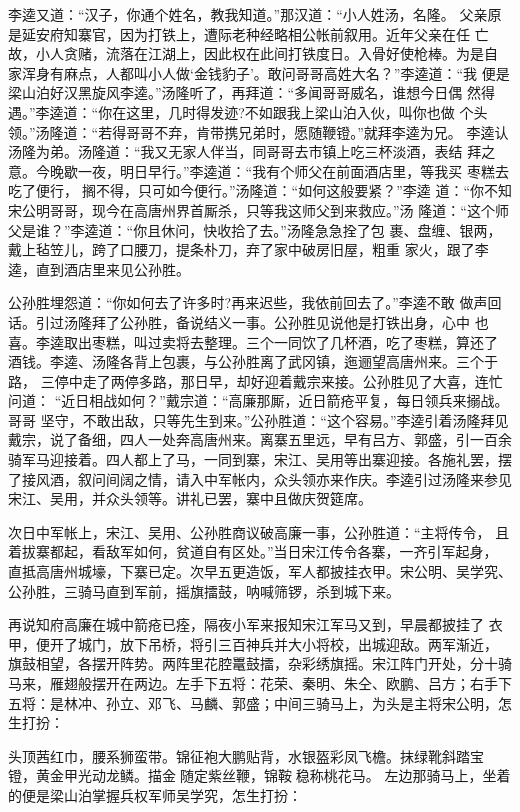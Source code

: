 李逵又道：“汉子，你通个姓名，教我知道。”那汉道：“小人姓汤，名隆。
父亲原是延安府知寨官，因为打铁上，遭际老种经略相公帐前叙用。近年父亲在任
亡故，小人贪赌，流落在江湖上，因此权在此间打铁度日。入骨好使枪棒。为是自
家浑身有麻点，人都叫小人做‘金钱豹子’。敢问哥哥高姓大名？”李逵道：“我
便是梁山泊好汉黑旋风李逵。”汤隆听了，再拜道：“多闻哥哥威名，谁想今日偶
然得遇。”李逵道：“你在这里，几时得发迹?不如跟我上梁山泊入伙，叫你也做
个头领。”汤隆道：“若得哥哥不弃，肯带携兄弟时，愿随鞭镫。”就拜李逵为兄。
李逵认汤隆为弟。汤隆道：“我又无家人伴当，同哥哥去市镇上吃三杯淡酒，表结
拜之意。今晚歇一夜，明日早行。”李逵道：“我有个师父在前面酒店里，等我买
枣糕去吃了便行，搁不得，只可如今便行。”汤隆道：“如何这般要紧？”李逵
道：“你不知宋公明哥哥，现今在高唐州界首厮杀，只等我这师父到来救应。”汤
隆道：“这个师父是谁？”李逵道：“你且休问，快收拾了去。”汤隆急急拴了包
裹、盘缠、银两，戴上毡笠儿，跨了口腰刀，提条朴刀，弃了家中破房旧屋，粗重
家火，跟了李逵，直到酒店里来见公孙胜。

公孙胜埋怨道：“你如何去了许多时?再来迟些，我依前回去了。”李逵不敢
做声回话。引过汤隆拜了公孙胜，备说结义一事。公孙胜见说他是打铁出身，心中
也喜。李逵取出枣糕，叫过卖将去整理。三个一同饮了几杯酒，吃了枣糕，算还了
酒钱。李逵、汤隆各背上包裹，与公孙胜离了武冈镇，迤逦望高唐州来。三个于路，
三停中走了两停多路，那日早，却好迎着戴宗来接。公孙胜见了大喜，连忙问道：
“近日相战如何？”戴宗道：“高廉那厮，近日箭疮平复，每日领兵来搦战。哥哥
坚守，不敢出敌，只等先生到来。”公孙胜道：“这个容易。”李逵引着汤隆拜见
戴宗，说了备细，四人一处奔高唐州来。离寨五里远，早有吕方、郭盛，引一百余
骑军马迎接着。四人都上了马，一同到寨，宋江、吴用等出寨迎接。各施礼罢，摆
了接风酒，叙问间阔之情，请入中军帐内，众头领亦来作庆。李逵引过汤隆来参见
宋江、吴用，并众头领等。讲礼已罢，寨中且做庆贺筵席。

次日中军帐上，宋江、吴用、公孙胜商议破高廉一事，公孙胜道：“主将传令，
且着拔寨都起，看敌军如何，贫道自有区处。”当日宋江传令各寨，一齐引军起身，
直抵高唐州城壕，下寨已定。次早五更造饭，军人都披挂衣甲。宋公明、吴学究、
公孙胜，三骑马直到军前，摇旗擂鼓，呐喊筛锣，杀到城下来。

再说知府高廉在城中箭疮已痊，隔夜小军来报知宋江军马又到，早晨都披挂了
衣甲，便开了城门，放下吊桥，将引三百神兵并大小将校，出城迎敌。两军渐近，
旗鼓相望，各摆开阵势。两阵里花腔鼍鼓擂，杂彩绣旗摇。宋江阵门开处，分十骑
马来，雁翅般摆开在两边。左手下五将：花荣、秦明、朱仝、欧鹏、吕方；右手下
五将：是林冲、孙立、邓飞、马麟、郭盛；中间三骑马上，为头是主将宋公明，怎
生打扮：

头顶茜红巾，腰系狮蛮带。锦征袍大鹏贴背，水银盔彩凤飞檐。抹绿靴斜踏宝
镫，黄金甲光动龙鳞。描金随定紫丝鞭，锦鞍稳称桃花马。
左边那骑马上，坐着的便是梁山泊掌握兵权军师吴学究，怎生打扮：


